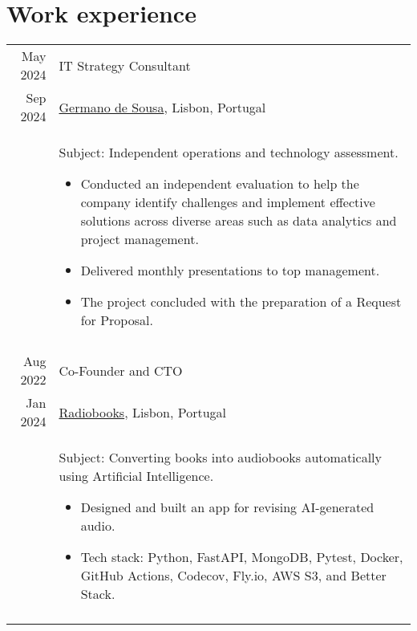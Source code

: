 \section{Work experience}

\begin{tabular}{r|p{\tabwidth}}

  {\small May 2024} 	& IT Strategy Consultant \\[\datespace]
  {\small Sep 2024} 	& {\small \href{https://www.germanodesousa.com/en/}{Germano de Sousa}, Lisbon, Portugal} \\[\title-main-sep]
  & {
    \parbox[t]{\tabwidth}{
    \footnotesize Subject: Independent operations and technology assessment.
    \begin{itemize}[topsep=0pt, partopsep=0pt, parsep=0pt, itemsep=0pt, leftmargin=*, after=\vspace{0pt}]
      \item Conducted an independent evaluation to help the company identify challenges and implement effective solutions across diverse areas such as data analytics and project management.
      \item Delivered monthly presentations to top management.
      \item The project concluded with the preparation of a Request for Proposal. 
    \end{itemize}
    }
  } \\
  \multicolumn{2}{c}{} \\

  {\small Aug 2022} & Co-Founder and CTO \\[\datespace]
  {\small Jan 2024} & {\small \href{https://radiobooks.webflow.io/}{Radiobooks}, Lisbon, Portugal} \\[\title-main-sep]
  & {
  \parbox[t]{\tabwidth}{
  \footnotesize Subject: Converting books into audiobooks automatically using Artificial Intelligence.
  \begin{itemize}[topsep=0pt, partopsep=0pt, parsep=0pt, itemsep=0pt, leftmargin=*, after=\vspace{0pt}]
    \item Designed and built an app for revising AI-generated audio.
    \item Tech stack: Python, FastAPI, MongoDB, Pytest, Docker, GitHub Actions, Codecov, Fly.io, AWS S3, and Better Stack.
  \end{itemize}
  }
  } \\
  \multicolumn{2}{c}{} \\


\end{tabular}
